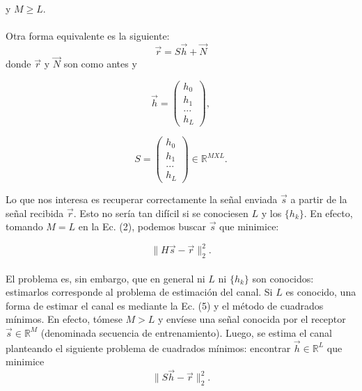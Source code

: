 \documentclass[10pt,journal,compsoc]{IEEEtran}
\begin{document}
y $M \geq L$. \\ \\
Otra forma equivalente es la siguiente:
\begin{equation}
\vec{r} = S\vec{h}+\vec{N}
\end{equation}
donde $\vec{r}$ y $\vec{N}$ son como antes y

\begin{equation}
\vec{h} = \left(
\begin{array}{c}
h_0\\ h_1\\ ...\\h_L
\end{array}
\right),
\end{equation}

\begin{equation}
S = \left(
\begin{array}{c}
h_0\\ h_1\\ ...\\h_L
\end{array}
\right) \in \mathbb{R}^{M X L}.
\end{equation}

Lo que nos interesa es recuperar correctamente la se\~nal enviada $\vec{s}$ a partir de la se\~nal recibida $\vec{r}$. Esto no ser\'ia tan dif\'icil si se conociesen $L$ y los $\{{h_{k}\}}$. En
efecto, tomando $M = L$ en la Ec. (2), podemos buscar $\vec{s}$ que minimice:

\begin{equation}
\| H\vec{s}-\vec{r}\|_{2}^{2}  .
\end{equation}
\\

El problema es, sin embargo, que en general ni $L$ ni $\{{h_{k}\}}$ son conocidos: estimarlos
corresponde al problema de estimaci\'on del canal.
Si $L$ es conocido, una forma de estimar el canal es mediante la Ec. (5) y el
m\'etodo de cuadrados m\'inimos. En efecto, t\'omese $M > L$ y env\'iese una se\~nal
conocida por el receptor $\vec{s} \in \mathbb{R}^{M} $ (denominada secuencia de entrenamiento).
Luego, se estima el canal planteando el siguiente problema de cuadrados m\'inimos:
encontrar $\vec{h} \in \mathbb{R}^{L} $ que minimice
\begin{equation}
\| S\vec{h}-\vec{r}\|_{2}^{2}  .
\end{equation}
\end{document}
